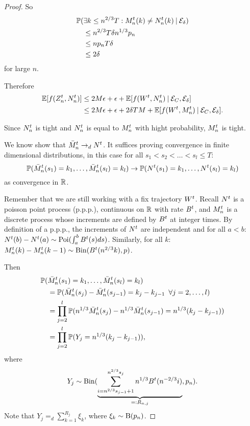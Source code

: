 \begin{proof}
So
\begin{align*}
&\mathbb{P}(\exists k\leq n^{2 / 3}T: M_n^t(k) \neq N_n^t(k) \: | \: \mathcal{E}_{\delta}) \\
&\quad \leq n^{2 / 3}T\delta n^{1 / 3}p_n \\
&\quad \leq n p_n T \delta \\
&\quad \leq 2\delta 
\end{align*}
for large $n$.

Therefore
\begin{align*}
\mathbb{E}[f(Z_n^t, N_n^t)] 
&\leq 2M\epsilon + \epsilon + \mathbb{E}[f(W^t, N_n^t) \: | \: \mathcal{E}_{C}, \mathcal{E}_{\delta}] \\
&\leq 2M\epsilon + \epsilon + 2\delta T M + \mathbb{E}[f(W^t, M_n^t) \: | \: \mathcal{E}_{C}, \mathcal{E}_{\delta}].
\end{align*}

Since $N_n^t$ is tight  and $N_n^t$ is equal to $M_n^t$ with hight probability,
$M_n^t$ is tight.

We know show that $\bar{M}_n^t \rightarrow_d N^t$.
It suffices proving convergence in finite dimensional distributions,
in this case for all $s_1 < s_2 < \dots < s_l \leq T$:
\begin{equation}
	\mathbb{P}( \bar{M}_n^t(s_1) = k_1, \dots, \bar{M}_n^t(s_l) = k_l ) \rightarrow 
	\mathbb{P}( N^t(s_1) = k_1, \dots, N^t(s_l) = k_l )
\end{equation}
as convergence in $\mathbb{R}$.

Remember that we are still working with a fix trajectory $W^t$.
Recall $N^t$ is a poisson point process (p.p.p.), continuous on $\mathbb{R}$ with rate $B^t$,
and $M_n^t$ is a discrete process whose increments are defined by $B^t$ at integer times.
By definition of a p.p.p., the increments of $N^t$ are independent and
for all $a<b$: $N^t(b) - N^t(a) \sim \operatorname*{Poi}( \int_{a}^{b} B^t(s)ds)$.
Similarly, for all $k$: $M_n^t(k) - M_n^t(k-1) \sim \operatorname*{Bin}(B^t(n^{2 / 3}k), p)$.

Then
\begin{align*}
&\mathbb{P}(\bar{M}_n^t(s_1) = k_1, \dots, \bar{M}_n^t(s_l) = k_l) \\
&\quad = \mathbb{P}( \bar{M}_n^t(s_j) - \bar{M}_n^t(s_{j-1}) = k_j - k_{j-1} \enspace \forall j=2,\dots,l ) \\
&\quad = \prod_{j=2}^{l} \mathbb{P}( n^{1 / 3}\bar{M}_n^t(s_j) - n^{1 / 3}\bar{M}_n^t(s_{j-1}) = n^{1 / 3}(k_j - k_{j-1})) \\
&\quad = \prod_{j=2}^{l} \mathbb{P}( Y_j = n^{1 / 3}(k_j - k_{j-1}) ),
\end{align*}
where
\begin{equation}
Y_j \sim \operatorname*{Bin}(\underbrace{\sum_{i=n^{2 / 3}s_{j-1}+1}^{n^{2 / 3}s_j}n^{1 / 3}B^t(n^{-2 / 3}i)}_{=: R_{n,j}}, p_n).
\end{equation}
Note that $Y_j =_d \sum_{k=1}^{R_j} \xi_k$, where $\xi_k \sim \operatorname*{B}(p_n)$.


\end{proof}
